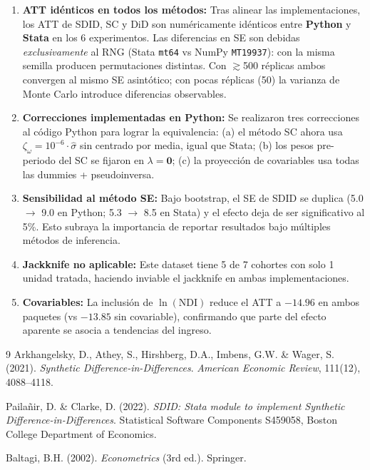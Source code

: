 \documentclass[11pt, a4paper]{article}
\newcommand{\py}{\textcolor{pyblue}{\textbf{Python}}}
\newcommand{\st}{\textcolor{stgreen}{\textbf{Stata}}}
\begin{document}
\begin{enumerate}
  \item \textbf{ATT idénticos en todos los métodos:} Tras alinear las implementaciones, los ATT de SDID, SC y DiD son numéricamente idénticos entre \py{} y \st{} en los 6 experimentos. Las diferencias en SE son debidas \textit{exclusivamente} al RNG (Stata \texttt{mt64} vs NumPy \texttt{MT19937}): con la misma semilla producen permutaciones distintas. Con $\gtrsim$500 réplicas ambos convergen al mismo SE asintótico; con pocas réplicas (50) la varianza de Monte Carlo introduce diferencias observables.

  \item \textbf{Correcciones implementadas en \py{}:} Se realizaron tres correcciones al código Python para lograr la equivalencia: (a) el método SC ahora usa $\zeta_\omega = 10^{-6} \cdot \hat\sigma$ sin centrado por media, igual que Stata; (b) los pesos pre-periodo del SC se fijaron en $\lambda = \mathbf{0}$; (c) la proyección de covariables usa todas las dummies + pseudoinversa.

  \item \textbf{Sensibilidad al método SE:} Bajo bootstrap, el SE de SDID se duplica (5.0 $\to$ 9.0 en Python; 5.3 $\to$ 8.5 en Stata) y el efecto deja de ser significativo al 5\%. Esto subraya la importancia de reportar resultados bajo múltiples métodos de inferencia.

  \item \textbf{Jackknife no aplicable:} Este dataset tiene 5 de 7 cohortes con solo 1 unidad tratada, haciendo inviable el jackknife en ambas implementaciones.

  \item \textbf{Covariables:} La inclusión de $\ln(\text{NDI})$ reduce el ATT a $-14.96$ en ambos paquetes (vs $-13.85$ sin covariable), confirmando que parte del efecto aparente se asocia a tendencias del ingreso.
\end{enumerate}

\newpage
\begin{thebibliography}{9}
Arkhangelsky, D., Athey, S., Hirshberg, D.A., Imbens, G.W. \& Wager, S. (2021).
\textit{Synthetic Difference-in-Differences}.
\textit{American Economic Review}, 111(12), 4088--4118.

Pailañir, D. \& Clarke, D. (2022).
\textit{SDID: Stata module to implement Synthetic Difference-in-Differences}.
Statistical Software Components S459058, Boston College Department of Economics.

Baltagi, B.H. (2002).
\textit{Econometrics} (3rd ed.). Springer.
\end{thebibliography}
\end{document}
